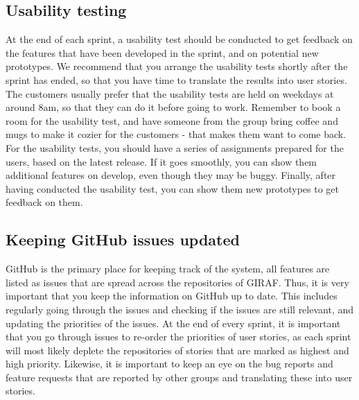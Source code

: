 \subsection{Usability testing}
At the end of each sprint, a usability test should be conducted to get feedback on the features that have been developed in the sprint, and on potential new prototypes.
We recommend that you arrange the usability tests shortly after the sprint has ended, so that you have time to translate the results into user stories.
The customers usually prefer that the usability tests are held on weekdays at around 8am, so that they can do it before going to work.
Remember to book a room for the usability test, and have someone from the group bring coffee and mugs to make it cozier for the customers - that makes them want to come back.
\\
For the usability tests, you should have a series of assignments prepared for the users, based on the latest release. If it goes smoothly, you can show them additional features on develop, even though they may be buggy.
Finally, after having conducted the usability test, you can show them new prototypes to get feedback on them. 

\subsection{Keeping GitHub issues updated}
GitHub is the primary place for keeping track of the system, all features are listed as issues that are spread across the repositories of GIRAF. Thus, it is very important that you keep the information on GitHub up to date.
This includes regularly going through the issues and checking if the issues are still relevant, and updating the priorities of the issues. 
At the end of every sprint, it is important that you go through issues to re-order the priorities of user stories, as each sprint will most likely deplete the repositories of stories that are marked as highest and high priority.
Likewise, it is important to keep an eye on the bug reports and feature requests that are reported by other groups and translating these into user stories.

